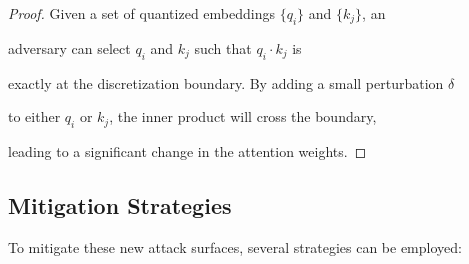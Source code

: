 \documentclass[11pt]{article}
\theoremstyle{definition}
\begin{document}
\begin{proof}






Given a set of quantized embeddings \( \{ q_i \} \) and \( \{ k_j \} \), an






adversary can select \( q_i \) and \( k_j \) such that \( q_i \cdot k_j \) is






exactly at the discretization boundary. By adding a small perturbation \( \delta \)






to either \( q_i \) or \( k_j \), the inner product will cross the boundary,






leading to a significant change in the attention weights.






\end{proof}













\subsection{Mitigation Strategies}













To mitigate these new attack surfaces, several strategies can be employed:
\end{document}
